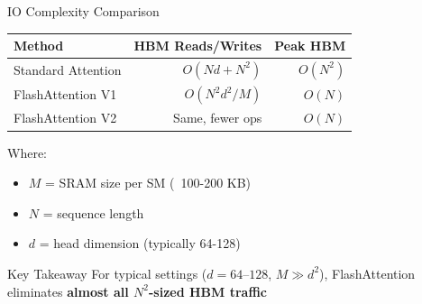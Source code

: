\documentclass[aspectratio=169,10pt]{beamer}
\begin{document}
\begin{frame}{IO Complexity Comparison}
    \begin{table}
        \centering
        \small
        \begin{tabular}{lrr}
            \toprule
            \textbf{Method} & \textbf{HBM Reads/Writes} & \textbf{Peak HBM} \\
            \midrule
            Standard Attention & $O(Nd + N^2)$ & $O(N^2)$ \\
            FlashAttention V1 & $O(N^2 d^2 / M)$ & $O(N)$ \\
            FlashAttention V2 & Same, fewer ops & $O(N)$ \\
            \bottomrule
        \end{tabular}
    \end{table}

    \vspace{0.5cm}
    Where:
    \begin{itemize}
        \item $M$ = SRAM size per SM (~100-200 KB)
        \item $N$ = sequence length
        \item $d$ = head dimension (typically 64-128)
    \end{itemize}

    \vspace{0.3cm}
    \begin{block}{Key Takeaway}
        For typical settings ($d=64$--$128$, $M \gg d^2$), FlashAttention eliminates \textbf{almost all $N^2$-sized HBM traffic}
    \end{block}


\end{frame}
\end{document}
